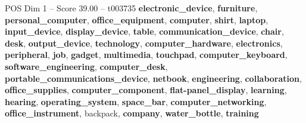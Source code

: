 \begin{textsample}{POS Dim 1 – Score 39.00 – t003735}  \label{ex:f1_pos_005}
\textbf{electronic\_device}, \textbf{furniture}, \textbf{personal\_computer}, \textbf{office\_equipment}, \textbf{computer}, \textbf{shirt}, \textbf{laptop}, \textbf{input\_device}, \textbf{display\_device}, \textbf{table}, \textbf{communication\_device}, \textbf{chair}, \textbf{desk}, \textbf{output\_device}, \textbf{technology}, \textbf{computer\_hardware}, \textbf{electronics}, \textbf{peripheral}, \textbf{job}, \textbf{gadget}, \textbf{multimedia}, \textbf{touchpad}, \textbf{computer\_keyboard}, \textbf{software\_engineering}, \textbf{computer\_desk}, \textbf{portable\_communications\_device}, \textbf{netbook}, \textbf{engineering}, \textbf{collaboration}, \textbf{office\_supplies}, \textbf{computer\_component}, \textbf{flat-panel\_display}, \textbf{learning}, \textbf{hearing}, \textbf{operating\_system}, \textbf{space\_bar}, \textbf{computer\_networking}, \textbf{office\_instrument}, backpack, \textbf{company}, \textbf{water\_bottle}, \textbf{training}

\end{textsample}
